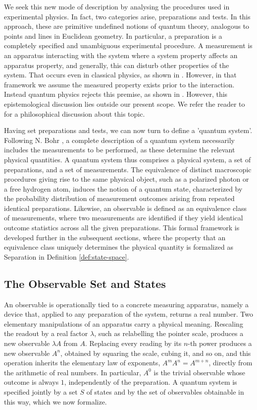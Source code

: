 We seek this new mode of description by analysing the procedures used in experimental physics. In fact, two categories arise, preparations and tests. In this approach, these are primitive undefined notions of quantum theory, analogous to points and lines in Euclidean geometry. In particular, a preparation is a completely specified and unambiguous experimental procedure. A measurement is an apparatus interacting with the system where a system property affects an apparatus property, and generally, this can disturb other properties of the system. That occurs even in classical physics, as shown in \cite[Section~12-2]{peresQuantumTheoryConcepts2002}. However, in that framework we assume the measured property exists prior to the interaction. Instead quantum physics rejects this premise, as shown in \cite[Section~1.5]{peresQuantumTheoryConcepts2002}. However, this epistemological discussion lies outside our present scope. We refer the reader to \cite{jammerPhilosophyQuantumMechanics1974} for a philosophical discussion about this topic.

Having set preparations and tests, we can now turn to define a 'quantum system'. Following N. Bohr \cite{bohrCanQuantumMechanicalDescription1935}, a complete description of a quantum system necessarily includes the measurements to be performed, as these determine the relevant physical quantities. A quantum system thus comprises a physical system, a set of preparations, and a set of measurements. The equivalence of distinct macroscopic procedures giving rise to the same physical object, such as a polarized photon or a free hydrogen atom, induces the notion of a quantum state, characterized by the probability distribution of measurement outcomes arising from repeated identical preparations. Likewise, an observable is defined as an equivalence class of measurements, where two measurements are identified if they yield identical outcome statistics across all the given preparations. This formal framework is developed further in the subsequent sections, where the property that an equivalence class uniquely determines the physical quantity is formalized as Separation in Definition \ref{def:state-space}.

\subsection*{The Observable Set and States}

An observable is operationally tied to a concrete measuring apparatus,
namely a device that, applied to any preparation of the system, returns a
real number. Two elementary manipulations of an apparatus carry a physical meaning. Rescaling the readout by a real factor $\lambda$, such as relabelling the pointer scale, produces a new
observable $\lambda A$ from $A$. Replacing every reading by its $n$-th
power produces a new observable $A^n$, obtained by squaring the scale,
cubing it, and so on, and this operation inherits the elementary law of
exponents, $A^mA^n=A^{m+n}$, directly from the arithmetic of real
numbers. In particular, $A^0$ is the trivial observable whose outcome is
always $1$, independently of the preparation. A quantum system is
specified jointly by a set $S$ of states and
by the set of observables obtainable in this way, which we now formalize.

